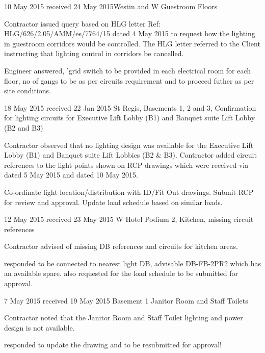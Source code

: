  {10 May 2015 received 24 May 2015}{Westin and W Guestroom Floors}
{
   \item Contractor issued query based on HLG letter Ref: HLG/626/2.05/AMM/es/7764/15 dated 4 May 2015
      to request how the lighting in guestroom corridors would be controlled. The HLG letter referred to the Client instructing that lighting control in corridors be cancelled. 
   \item Engineer answered, 'grid switch to be provided in each electrical room for each floor, no of gangs to be as per circuits requirement and to proceed futher as per site conditions.  
}{}{}


 {18 May 2015 received 22 Jan 2015} {St Regis, Basements 1, 2 and 3, Confirmation for lighting circuits for Executive Lift Lobby (B1) and Banquet suite Lift Lobby (B2 and B3) }%
 {
  \item Contractor observed that no lighting design was available for the Executive Lift Lobby (B1) and Banquet suite Lift Lobbies (B2 \& B3). Contractor added circuit references to the light points shown on RCP drawings which were received via  dated 5 May 2015 and  dated 10 May 2015.
  \item Co-ordinate light location/distribution with ID/Fit Out drawings. Submit RCP for review and approval. Update load schedule based on similar loads.
 }{}{}

 {12 May 2015 received 23 May 2015} {W Hotel Podium 2, Kitchen, missing circuit references}
 {
   \item Contractor advised of missing DB references and circuits for kitchen areas.
   \item \KA responded to be connected to nearest light DB, advisable DB-FB-2PR2 which has an available spare. \KA also requested for the load schedule to be submitted for approval.
 }
 {}{}

 {7 May 2015 received 19 May 2015} {Basement 1 Janitor Room and Staff Toilets }
{
  \item Contractor noted that the Janitor Room and Staff Toilet lighting and power design is not available.
  \item \KA responded to update the drawing and to be resubmitted for approval!
}


